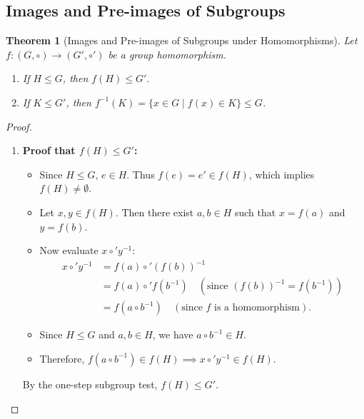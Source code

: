 \documentclass[12pt]{article}
\theoremstyle{definition}
\theoremstyle{plain}
\newtheorem{theorem}{Theorem}[section]
\begin{document}
\subsection{Images and Pre-images of Subgroups}

\begin{theorem}[Images and Pre-images of Subgroups under Homomorphisms]
Let $f: (G, \circ) \longrightarrow (G', \circ')$ be a group homomorphism.
\begin{enumerate}
    \item If $H \le G$, then $f(H) \le G'$.
    \item If $K \le G'$, then $f^{-1}(K) = \{x \in G \mid f(x) \in K\} \le G$.
\end{enumerate}
\end{theorem}

\begin{proof}
\begin{enumerate}
    \item \textbf{Proof that $f(H) \le G'$:}
    \begin{itemize}
        \item Since $H \le G$, $e \in H$. Thus $f(e) = e' \in f(H)$, which implies $f(H) \neq \emptyset$.
        \item Let $x, y \in f(H)$. Then there exist $a, b \in H$ such that $x = f(a)$ and $y = f(b)$.
        \item Now evaluate $x \circ' y^{-1}$:
        \begin{align*}
            x \circ' y^{-1} &= f(a) \circ' (f(b))^{-1} \\
            &= f(a) \circ' f(b^{-1}) \quad (\text{since } (f(b))^{-1} = f(b^{-1})) \\
            &= f(a \circ b^{-1}) \quad (\text{since } f \text{ is a homomorphism}).
        \end{align*}
        \item Since $H \le G$ and $a, b \in H$, we have $a \circ b^{-1} \in H$.
        \item Therefore, $f(a \circ b^{-1}) \in f(H) \implies x \circ' y^{-1} \in f(H)$.
    \end{itemize}
    By the one-step subgroup test, $\boxed{f(H) \le G'}$.


\end{enumerate}
\end{proof}
\end{document}
